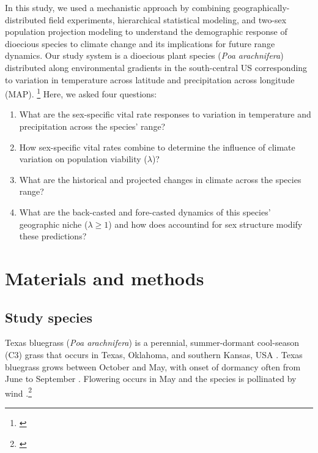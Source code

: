 \documentclass[11pt]{article}\usepackage[]{graphicx}\usepackage[usenames,dvipsnames]{xcolor}
\newcommand{\tom}[2]{{\color{red}{#1}}\footnote{\textit{\color{red}{#2}}}}
\begin{document}
In this study, we used a mechanistic approach by combining geographically-distributed field experiments, hierarchical statistical modeling, and two-sex population projection modeling to understand the demographic response of dioecious species to climate change and its implications for future range dynamics.
Our study system is a dioecious plant species (\textit{Poa arachnifera}) distributed along environmental gradients in the south-central US corresponding to variation in temperature across latitude and precipitation across longitude (MAP). \tom{}{I would include a few more sentences of context about the study before jumping to the questions. For example it seems relevant to acknowledge the previous study and highlight that our previous approach used proxy variables, so could not be used to forecast responses to environmental change.}
Here, we asked four questions: 
\begin{enumerate}
	\item What are the sex-specific vital rate responses to variation in temperature and precipitation across the species' range?
	\item How sex-specific vital rates combine to determine the influence of climate variation on population viability ($\lambda$)?
	\item What are the historical and projected changes in climate across the species range?
	\item What are the back-casted and fore-casted dynamics of this species' geographic niche ($\lambda \geq 1$) and how does accountind for sex structure modify these predictions?
\end{enumerate}

\section*{Materials and methods}

\subsection*{Study species}
Texas bluegrass (\textit{Poa arachnifera}) is a perennial, summer-dormant cool-season (C3) grass that occurs in Texas, Oklahoma, and southern Kansas, USA \citep{hitchcock1971manual}. 
Texas bluegrass grows between October and May, with onset of dormancy often from June to September \citep{kindiger2004interspecific}.
Flowering occurs in May and the species is pollinated by wind \citep{hitchcock1971manual}.\tom{}{I think you need to say more about the geographic region and its climate. It will be important to motivate the split of growing and dormant seasons based on the natural history. You also need to describe the reproductive biology including dioecy and wind-pollination.}
\end{document}
